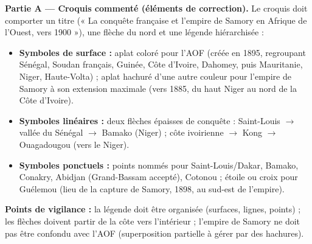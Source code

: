 \documentclass[11pt]{article}
\begin{document}
\begin{corrige}
\textbf{Partie A — Croquis commenté (éléments de correction).}
Le croquis doit comporter un titre (« La conquête française et l'empire de Samory en Afrique de l'Ouest, vers 1900 »), une flèche du nord et une légende hiérarchisée :
\begin{itemize}
    \item \textbf{Symboles de surface :} aplat coloré pour l'AOF (créée en 1895, regroupant Sénégal, Soudan français, Guinée, Côte d'Ivoire, Dahomey, puis Mauritanie, Niger, Haute-Volta) ; aplat hachuré d'une autre couleur pour l'empire de Samory à son extension maximale (vers 1885, du haut Niger au nord de la Côte d'Ivoire).
    \item \textbf{Symboles linéaires :} deux flèches épaisses de conquête : Saint-Louis $\rightarrow$ vallée du Sénégal $\rightarrow$ Bamako (Niger) ; côte ivoirienne $\rightarrow$ Kong $\rightarrow$ Ouagadougou (vers le Niger).
    \item \textbf{Symboles ponctuels :} points nommés pour Saint-Louis/Dakar, Bamako, Conakry, Abidjan (Grand-Bassam accepté), Cotonou ; étoile ou croix pour Guélemou (lieu de la capture de Samory, 1898, au sud-est de l'empire).
\end{itemize}
\textbf{Points de vigilance :} la légende doit être organisée (surfaces, lignes, points) ; les flèches doivent partir de la côte vers l'intérieur ; l'empire de Samory ne doit pas être confondu avec l'AOF (superposition partielle à gérer par des hachures).


\end{corrige}
\end{document}
